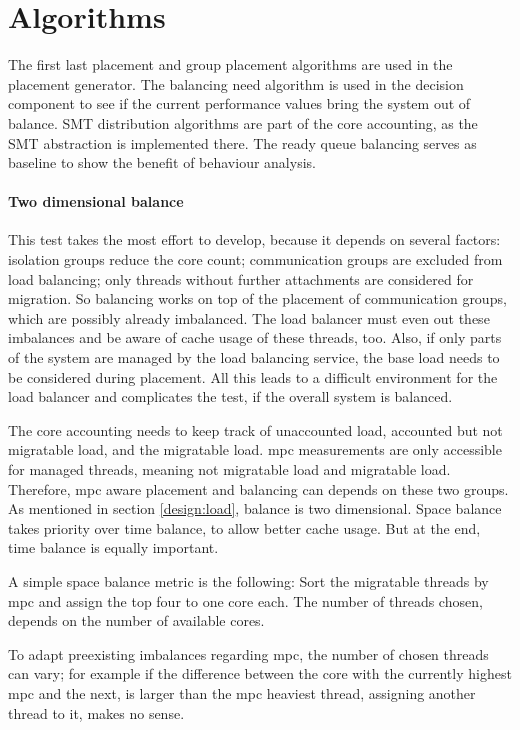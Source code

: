 \section{Algorithms}
\label{impl:algos}

The first last placement and group placement algorithms are used in the
placement generator.
The balancing need algorithm is used in the decision component to see if the
current performance values bring the system out of balance.
SMT distribution algorithms are part of the core accounting, as the SMT
abstraction is implemented there.
The ready queue balancing serves as baseline to show the benefit of behaviour
analysis.

\paragraph{Two dimensional balance}
This test takes the most effort to develop, because it depends on several
factors: isolation groups reduce the core count; communication groups are
excluded from load balancing; only threads without further attachments are
considered for migration.
So balancing works on top of the placement of communication groups, which are
possibly already imbalanced.
The load balancer must even out these imbalances and be aware of cache usage of
these threads, too.
Also, if only parts of the system are managed by the load balancing service,
the base load needs to be considered during placement.
All this leads to a difficult environment for the load balancer and complicates
the test, if the overall system is balanced.

The core accounting needs to keep track of unaccounted load, accounted but
not migratable load, and the migratable load.
\Gls{mpc} measurements are only accessible for managed threads, meaning not
migratable load and migratable load.
Therefore, \gls{mpc} aware placement and balancing can depends on these two
groups.
\\

As mentioned in section \ref{design:load}, balance is two dimensional.
Space balance takes priority over time balance, to allow better cache usage.
But at the end, time balance is equally important.

A simple space balance metric is the following: Sort the migratable threads by
\gls{mpc} and assign the top four to one core each.
The number of threads chosen, depends on the number of available cores.

To adapt preexisting imbalances regarding \gls{mpc},  the number of chosen
threads can vary; for example if the difference between the core with the
currently highest \gls{mpc} and the next, is larger than the \gls{mpc} heaviest
thread, assigning another thread to it, makes no sense.

